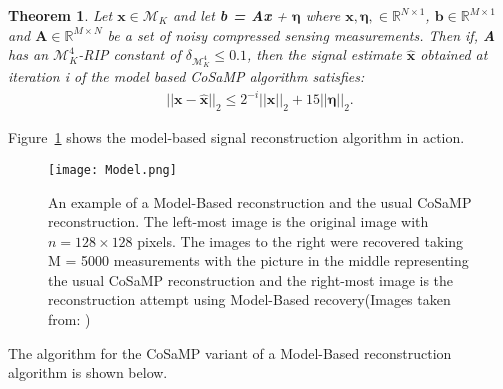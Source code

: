 \documentclass[titlepage,oneside, 12pt]{book}
\theoremstyle{break}
\begin{document}
\newtheorem*{UB}{Theorem}
\begin{UB}
Let $\textbf{x} \in \mathcal{M}_{K}$ and let \textbf{b = Ax} + $\pmb{\eta}$ where $\textbf{x},\pmb{\eta},  \in \mathbb{R}^{N \times 1}$, $\textbf{b}\in \mathbb{R}^{M \times 1}$ and $\textbf{A} \in \mathbb{R}^{M \times N}$ be a set of noisy compressed sensing measurements. Then if, \textbf{A} has an $\mathcal{M}^{4}_{K}$-RIP constant of
 $\delta_{\mathcal{M}_{K}^{4}} \leq 0.1$, then the signal estimate $\hat{\textbf{x}}$ obtained at iteration i of the model based CoSaMP algorithm satisfies: 
 \begin{equation}
\begin{gathered}
||\textbf{x} - \hat{\textbf{x}}||_2 \leq 2^{-i} ||\textbf{x}||_2 + 15||\pmb{\eta}||_2. 
\end{gathered}
\label{eqn:UB}
\end{equation}
\end{UB}
Figure~\ref{fig:ModelReconstruct} shows the model-based signal reconstruction algorithm in action. 


\begin{figure}[H]
\centering
\texttt{[image: Model.png]}
\caption{An example of a Model-Based reconstruction and the usual CoSaMP reconstruction. The left-most image is the original image with $n = 128 \times 128$ pixels. The images to the right were recovered taking M = 5000 measurements with the picture in the middle representing the usual CoSaMP reconstruction and the right-most image is the reconstruction attempt using Model-Based recovery(Images taken from: \cite{MBCS})}
\label{fig:ModelReconstruct}
\end{figure}


\newpage

The algorithm for the CoSaMP variant of a Model-Based reconstruction algorithm is shown below. 
\end{document}
